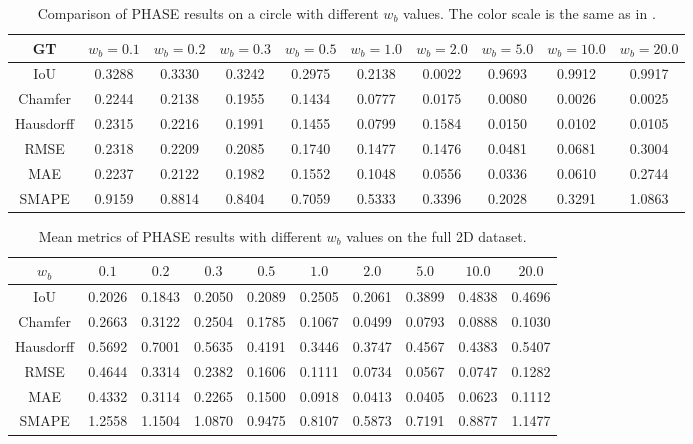 \begin{table}[t]
\begin{tabular}{cccccccccc}
        GT & $w_b = 0.1$ & $w_b = 0.2$ & $w_b = 0.3$ & $w_b = 0.5$ & $w_b = 1.0$ & $w_b = 2.0$ & $w_b = 5.0$ & $w_b = 10.0$ & $w_b = 20.0$ \\ [1ex]
        \toprule
        IoU & 0.3288 & 0.3330 & 0.3242 & 0.2975 & 0.2138 & 0.0022 & 0.9693 & 0.9912 & 0.9917 \\
        Chamfer & 0.2244 & 0.2138 & 0.1955 & 0.1434 & 0.0777 & 0.0175 & 0.0080 & 0.0026 & 0.0025 \\
        Hausdorff & 0.2315 & 0.2216 & 0.1991 & 0.1455 & 0.0799 & 0.1584 & 0.0150 & 0.0102 & 0.0105 \\
        RMSE & 0.2318 & 0.2209 & 0.2085 & 0.1740 & 0.1477 & 0.1476 & 0.0481 & 0.0681 & 0.3004 \\
        MAE & 0.2237 & 0.2122 & 0.1982 & 0.1552 & 0.1048 & 0.0556 & 0.0336 & 0.0610 & 0.2744 \\
        SMAPE & 0.9159 & 0.8814 & 0.8404 & 0.7059 & 0.5333 & 0.3396 & 0.2028 & 0.3291 & 1.0863 \\
        \bottomrule
    \end{tabular}
    \caption{Comparison of PHASE results on a circle with different $w_b$ values. The color scale is the same as in .}
    \label{fig:phase-boundary-weight-circle}
\end{table}

\begin{table}[t]
    \setlength{\tabcolsep}{4pt}
    \centering
    \begin{tabular}{cccccccccc}
        \toprule
        $w_b$ & $0.1$ & $0.2$ & $0.3$ & $0.5$ & $1.0$ & $2.0$ & $5.0$ & $10.0$ & $20.0$ \\
        \midrule
        IoU & 0.2026 & 0.1843 & 0.2050 & 0.2089 & 0.2505 & 0.2061 & 0.3899 & 0.4838 & 0.4696 \\
        Chamfer & 0.2663 & 0.3122 & 0.2504 & 0.1785 & 0.1067 & 0.0499 & 0.0793 & 0.0888 & 0.1030 \\
        Hausdorff & 0.5692 & 0.7001 & 0.5635 & 0.4191 & 0.3446 & 0.3747 & 0.4567 & 0.4383 & 0.5407 \\
        RMSE & 0.4644 & 0.3314 & 0.2382 & 0.1606 & 0.1111 & 0.0734 & 0.0567 & 0.0747 & 0.1282 \\
        MAE & 0.4332 & 0.3114 & 0.2265 & 0.1500 & 0.0918 & 0.0413 & 0.0405 & 0.0623 & 0.1112 \\
        SMAPE & 1.2558 & 1.1504 & 1.0870 & 0.9475 & 0.8107 & 0.5873 & 0.7191 & 0.8877 & 1.1477 \\
        \bottomrule
    \end{tabular}
    \caption{Mean metrics of PHASE results with different $w_b$ values on the full 2D dataset.}
    \label{tab:phase-boundary-weight-metrics}
\end{table}

